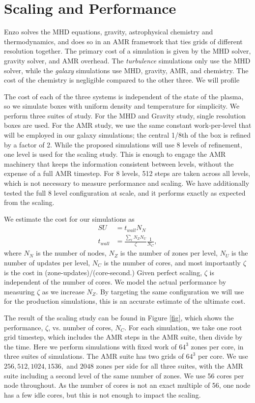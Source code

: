 \section{Scaling and Performance}
\label{sec.scaling}
Enzo solves the MHD equations, gravity, astrophysical chemistry and
thermodynamics, and does so in an AMR framework that ties grids of different
resolution together.  The primary cost of a simulation is given by the MHD solver, gravity solver, and
AMR overhead.  The \emph{turbulence} simulations only use the MHD solver, while
the \emph{galaxy} simulations use MHD, gravity, AMR, and chemistry.  The cost of
the chemistry is negligible compared to the other three.  We will profile 

The cost of each of the three systems is independent of the state of the plasma,
so we simulate boxes with uniform density and temperature for simplicity.  We
perform three suites of study.  For the MHD and Gravity study, single resolution
boxes are used.  For the AMR study, we use the same constant work-per-level
that will be employed in our galaxy simulations; the central 1/8th of the box is
refined by a factor of 2.  
While the proposed simulations will use 8 levels of
refinement, one level is used for the scaling study.  This is enough to engage the AMR machinery that keeps the
information consistent between levels, without the expense of a full AMR
timestep.  For 8 levels, 512 steps are taken across all levels, which is not
necessary to measure performance and scaling.
We have additionally tested the full 8 level configuration at scale, and it
performs exactly as expected from the scaling.

We estimate the cost for our simulations as 
\begin{align}
SU &= t_{wall} N_N\\
t_{wall} &= \frac{\sum_\ell N_Z N_U}{\zeta}\frac{1}{N_C},
\end{align}
where $N_N$ is the number of nodes, $N_Z$ is the number of zones per level,
$N_U$ is the number of updates per level, $N_C$ is the number of cores, and most
importantly $\zeta$ is the cost in (zone-updates)/(core-second.)  Given perfect
scaling, $\zeta$ is independent of the number of cores.  We model the actual
performance by measuring $\zeta$ as we increase $N_Z$.  By targeting the same
configuration we will use for the production simulations, this is an accurate
estimate of the ultimate cost.

The result of the scaling study can be found in Figure \ref{fig}, which shows
the performance, $\zeta$, vs. number of cores, $N_C$.  For each simulation, we
take one root grid timestep, which includes the AMR steps in the AMR suite, then
divide by the time.  Here we
perform simulations with fixed work of $64^3$ zones per core, in three suites of
simulations.  The AMR suite has two grids of $64^3$ per core.  We use $256, 512,
1024, 1536,$ and $2048$ zones per side for all three suites, with the AMR suite
including a second level of the same number of zones.  We use 56 cores per node
throughout.  As the number of cores is not an exact multiple of 56, one node has
a few idle cores, but this is not enough to impact the scaling.  

